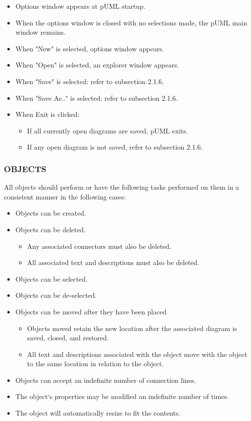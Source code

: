 \documentclass[twoside,letterpaper]{article}
\begin{document}
{
\begin{itemize}
\item Options window appears at pUML startup.
\item When the options window is closed with no selections made, the pUML main window remains.
\item When "New" is selected, options window appears.
\item When "Open" is selected, an explorer window appears.
\item When "Save" is selected: refer to subsection 2.1.6.
\item When "Save As.." is selected: refer to subsection 2.1.6.
\item When Exit is clicked:
\begin{itemize}
\item If all currently open diagrams are saved, pUML exits.
\item If any open diagram is not saved, refer to subsection 2.1.6.
\end{itemize}
\end{itemize}
\bigskip

\subsubsection[OBJECTS]{\bfseries OBJECTS} 

All objects should perform or have the following tasks performed on them in a consistent manner in the following cases: 
\begin{itemize}
	\item Objects can be created.
	\item Objects can be deleted.
\begin{itemize}
\item Any associated connectors must also be deleted.
\item All associated text and descriptions must also be deleted.
\end{itemize}
	\item Objects can be selected.
	\item Objects can be de-selected.
	\item Objects can be moved after they have been placed
\begin{itemize}
\item Objects moved retain the new location after the associated diagram is saved, closed, and restored.
\item All text and descriptions associated with the object move with the object to the same location in relation to the object.
\end{itemize}
\item Objects can accept an indefinite number of connection lines.
\item The object`s properties may be modified an indefinite number of times.
\item The object will automatically resize to fit the contents.
\end{itemize}

}
\end{document}
